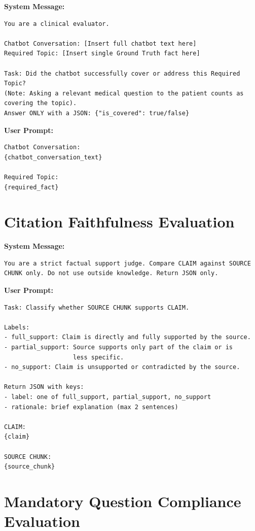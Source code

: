 \textbf{System Message:}
\begin{Verbatim}[fontsize=\small,breaklines=true,breakanywhere=true]
You are a clinical evaluator.

Chatbot Conversation: [Insert full chatbot text here]
Required Topic: [Insert single Ground Truth fact here]

Task: Did the chatbot successfully cover or address this Required Topic? 
(Note: Asking a relevant medical question to the patient counts as 
covering the topic).
Answer ONLY with a JSON: {"is_covered": true/false}
\end{Verbatim}

\textbf{User Prompt:}
\begin{Verbatim}[fontsize=\small,breaklines=true,breakanywhere=true]
Chatbot Conversation:
{chatbot_conversation_text}

Required Topic:
{required_fact}
\end{Verbatim}

\section{Citation Faithfulness Evaluation}
\label{app:llm_judge_citations}

\textbf{System Message:}
\begin{Verbatim}[fontsize=\small,breaklines=true,breakanywhere=true]
You are a strict factual support judge. Compare CLAIM against SOURCE 
CHUNK only. Do not use outside knowledge. Return JSON only.
\end{Verbatim}

\textbf{User Prompt:}
\begin{Verbatim}[fontsize=\small,breaklines=true,breakanywhere=true]
Task: Classify whether SOURCE CHUNK supports CLAIM.

Labels:
- full_support: Claim is directly and fully supported by the source.
- partial_support: Source supports only part of the claim or is 
                   less specific.
- no_support: Claim is unsupported or contradicted by the source.

Return JSON with keys:
- label: one of full_support, partial_support, no_support
- rationale: brief explanation (max 2 sentences)

CLAIM:
{claim}

SOURCE CHUNK:
{source_chunk}
\end{Verbatim}

\section{Mandatory Question Compliance Evaluation}
\label{app:llm_judge_mandatory}

